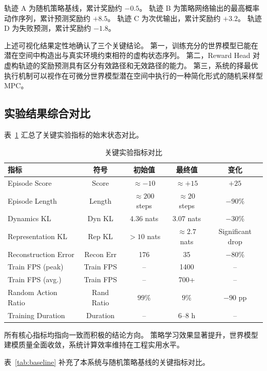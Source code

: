 \documentclass[12pt,a4paper]{ctexart}
\begin{document}
轨迹 A 为随机策略基线，累计奖励约 $-0.5$。
轨迹 B 为策略网络输出的最高概率动作序列，累计预测奖励约 $+8.5$。
轨迹 C 为次优输出，累计奖励约 $+3.2$。
轨迹 D 为失败预测，累计奖励约 $-1.8$。

上述可视化结果定性地确认了三个关键结论。
第一，训练充分的世界模型已能在潜在空间中构造出与真实环境约束相符的虚构状态序列。
第二，Reward Head 对虚构轨迹的奖励预测具有区分有效路径和无效路径的能力。
第三，系统的择最优执行机制可以视作在可微分世界模型潜在空间中执行的一种简化形式的随机采样型 MPC。

\subsection{实验结果综合对比}

表~\ref{tab:results} 汇总了关键实验指标的始末状态对比。

\begin{table}[H]
    \centering
    \caption{关键实验指标对比}
    \label{tab:results}
    \begin{tabular}{@{}lcccc@{}}
        \toprule
        \textbf{指标} & \textbf{符号} & \textbf{初始值} & \textbf{最终值} & \textbf{变化} \\
        \midrule
        Episode Score & Score & $\approx-10$ & $\approx+15$ & $+25$ \\
        Episode Length & Length & $\approx200$ steps & $\approx20$ steps & $-90\%$ \\
        Dynamics KL & Dyn KL & 4.36 nats & 3.07 nats & $-30\%$ \\
        Representation KL & Rep KL & $>10$ nats & $\approx2.7$ nats & Significant drop \\
        Reconstruction Error & Recon Err & 176 & 35 & $-80\%$ \\
        Train FPS (peak) & Train FPS & -- & 1400 & -- \\
        Train FPS (avg.) & Train FPS & -- & 700+ & -- \\
        Random Action Ratio & Rand Ratio & $99\%$ & $9\%$ & $-90$ pp \\
        Training Duration & Duration & -- & 6--8 h & -- \\
        \bottomrule
    \end{tabular}
\end{table}

所有核心指标均指向一致而积极的结论方向。
策略学习效果显著提升，世界模型建模质量全面收敛，系统计算效率维持在工程实用水平。

表~\ref{tab:baseline} 补充了本系统与随机策略基线的关键指标对比。
\end{document}
